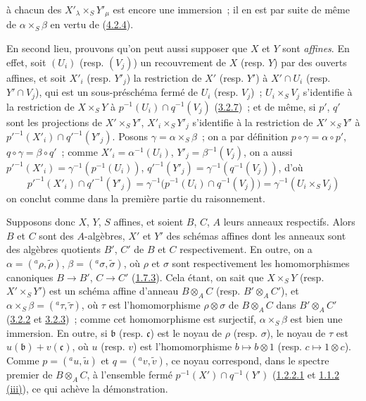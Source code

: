 à chacun des $X'_\lambda\times_S Y'_\mu$ est encore une immersion~; il en est
par suite de même de $\alpha\times_S\beta$ en vertu de
(\hyperref[I.4.2.4-fr]{4.2.4}).

En second lieu, prouvons qu'on peut aussi supposer que $X$ et $Y$ sont
\emph{affines}. En effet, soit $(U_i)$ (resp. $(V_j)$) un recouvrement de $X$
(resp. $Y$) par des ouverts affines, et soit $X'_i$ (resp. $Y'_j$) la
restriction de $X'$ (resp. $Y'$) à $X'\cap U_i$ (resp. $Y'\cap V_j$), qui est
un sous-préschéma fermé de $U_i$ (resp. $V_j$)~; $U_i\times_S V_j$ s'identifie
à la restriction de $X\times_S Y$ à
$p^{-1}(U_i)\cap q^{-1}(V_j)$ (\hyperref[I.3.2.7-fr]{3.2.7})~; et de même, si
$p'$, $q'$ sont les projections de $X'\times_S Y'$,
$X'_i\times_S Y'_j$ s'identifie à la restriction de $X'\times_S Y'$ à
${p'}^{-1}(X'_i)\cap{q'}^{-1}(Y'_j)$. Posons
$\gamma=\alpha\times_S\beta$~; on a par définition
$p\circ\gamma=\alpha\circ p'$, $q\circ\gamma=\beta\circ q'$~; comme
$X'_i=\alpha^{-1}(U_i)$, $Y'_j=\beta^{-1}(V_j)$, on a aussi
${p'}^{-1}(X'_i)=\gamma^{-1}(p^{-1}(U_i))$,
${q'}^{-1}(Y'_j)=\gamma^{-1}(q^{-1}(V_j))$, d'où
\[
  {p'}^{-1}(X'_i)\cap{q'}^{-1}(Y'_j)
  =\gamma^{-1}\bigl(p^{-1}(U_i)\cap q^{-1}(V_j)\bigr)
  =\gamma^{-1}(U_i\times_S V_j)
\]
on conclut comme dans la première partie du raisonnement.

Supposons donc $X$, $Y$, $S$ affines, et soient $B$, $C$, $A$ leurs anneaux
respectifs. Alors $B$ et $C$ sont des $A$-algèbres, $X'$ et $Y'$ des schémas
affines dont les anneaux sont des algèbres quotients $B'$, $C'$ de $B$ et
$C$ respectivement. En outre, on a
$\alpha=({}^a\rho,\widetilde{\rho})$, $\beta=({}^a\sigma,\widetilde{\sigma})$,
où $\rho$ et $\sigma$ sont respectivement les homomorphismes canoniques
$B\to B'$, $C\to C'$ (\hyperref[I.1.7.3-fr]{1.7.3}). Cela étant, on sait que
$X\times_S Y$ (resp. $X'\times_S Y'$) est un schéma affine d'anneau
$B\otimes_A C$ (resp. $B'\otimes_A C'$), et
$\alpha\times_S\beta=({}^a\tau,\widetilde{\tau})$, où $\tau$ est
l'homomorphisme $\rho\otimes\sigma$ de $B\otimes_A C$ dans
$B'\otimes_A C'$ (\hyperref[I.3.2.2-fr]{3.2.2} et
\hyperref[I.3.2.3-fr]{3.2.3})~; comme cet homomorphisme est surjectif,
$\alpha\times_S\beta$ est bien une immersion. En outre, si $\mathfrak{b}$
(resp. $\mathfrak{c}$) est le noyau de $\rho$ (resp. $\sigma$), le noyau de
$\tau$ est $u(\mathfrak{b})+v(\mathfrak{c})$, où $u$ (resp. $v$) est
l'homomorphisme $b\mapsto b\otimes1$ (resp. $c\mapsto1\otimes c$). Comme
$p=({}^a u,\widetilde{u})$ et $q=({}^a v,\widetilde{v})$, ce noyau correspond,
dans le spectre premier de $B\otimes_A C$, à l'ensemble fermé
$p^{-1}(X')\cap q^{-1}(Y')$ (\hyperref[I.1.2.2.1-fr]{1.2.2.1} et
\hyperref[I.1.1.2-fr]{1.1.2 (iii)}), ce qui achève la démonstration.

